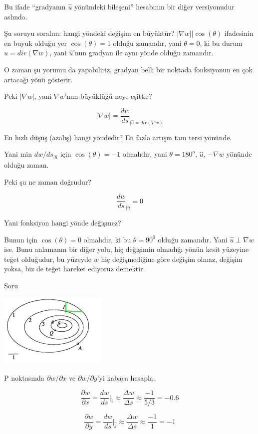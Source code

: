 \documentclass[12pt,fleqn]{article}\usepackage{../../common}
\begin{document}
Bu ifade ``gradyanın $\hat{u}$ yönündeki bileşeni'' hesabının bir diğer
versiyonudur aslında. 

Şu soruyu soralım: hangi yöndeki değişim en büyüktür? $|\nabla w||\cos(\theta)$
ifadesinin en buyuk olduğu yer $\cos(\theta)=1$ olduğu zamandır, yani $\theta =
0$, ki bu durum $\hat{u} = dir(\nabla w)$, yani $\hat{u}$'nun gradyan ile aynı
yönde olduğu zamandır.

O zaman şu yorumu da yapabiliriz, gradyan belli bir noktada fonksiyonun en
çok artacağı yönü gösterir. 

Peki $|\nabla w|$, yani $\nabla w$'nun büyüklüğü neye eşittir? 

$$ |\nabla w| =   \frac{dw}{ds}_{|\hat{u}=dir(\nabla w)}  $$

En hızlı düşüş (azalış) hangi yöndedir? En fazla artışın tam tersi
yönünde. 

Yani min $dw/ds_{|\hat{u}}$ için $\cos(\theta) = -1$ olmalıdır, yani $\theta =
180^o$,  $\hat{u}$, $-\nabla w$  yönünde olduğu zaman.

Peki şu ne zaman doğrudur? 

$$ \frac{dw}{ds}_{|\hat{u}} = 0 $$

Yani fonksiyon hangi yönde değişmez? 

Bunun için $\cos(\theta) = 0$ olmalıdır, ki bu $\theta = 90^0$ olduğu
zamandır. Yani $\hat{u} \perp \nabla w$ ise. Bunu anlamanın bir diğer yolu, hiç
değişimin olmadığı yönün kesit yüzeyine teğet olduğudur, bu yüzeyde $w$ hiç
değişmediğine göre değişim olmaz, değişim yoksa, biz de teğet hareket ediyoruz
demektir.

Soru
\begin{center}
\includegraphics[height=3.5cm]{2d9.png}
\end{center}
P noktasında $\partial w/ \partial x$ ve $\partial w/\partial y$'yi 
kabaca hesapla. 

$$ \frac{\partial w}{\partial x} = \frac{dw}{ds} \bigg|_{\hat{i}} \approx
\frac{\Delta w}{\Delta s} \approx
\frac{-1}{5/3} = -0.6
$$

$$ \frac{\partial w}{\partial y} = \frac{dw}{ds} \bigg|_{\hat{j}} \approx
\frac{\Delta w}{\Delta s} \approx
\frac{-1}{1} = -1
$$
\end{document}
